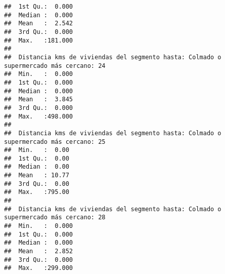 \documentclass[11pt,]{article}
\begin{document}
\begin{verbatim}
##  1st Qu.:  0.000                                                                      
##  Median :  0.000                                                                      
##  Mean   :  2.542                                                                      
##  3rd Qu.:  0.000                                                                      
##  Max.   :181.000                                                                      
##                                                                                       
##  Distancia kms de viviendas del segmento hasta: Colmado o supermercado más cercano: 24
##  Min.   :  0.000                                                                      
##  1st Qu.:  0.000                                                                      
##  Median :  0.000                                                                      
##  Mean   :  3.845                                                                      
##  3rd Qu.:  0.000                                                                      
##  Max.   :498.000                                                                      
##                                                                                       
##  Distancia kms de viviendas del segmento hasta: Colmado o supermercado más cercano: 25
##  Min.   :  0.00                                                                       
##  1st Qu.:  0.00                                                                       
##  Median :  0.00                                                                       
##  Mean   : 10.77                                                                       
##  3rd Qu.:  0.00                                                                       
##  Max.   :795.00                                                                       
##                                                                                       
##  Distancia kms de viviendas del segmento hasta: Colmado o supermercado más cercano: 28
##  Min.   :  0.000                                                                      
##  1st Qu.:  0.000                                                                      
##  Median :  0.000                                                                      
##  Mean   :  2.852                                                                      
##  3rd Qu.:  0.000                                                                      
##  Max.   :299.000                                                                      

\end{verbatim}
\end{document}
